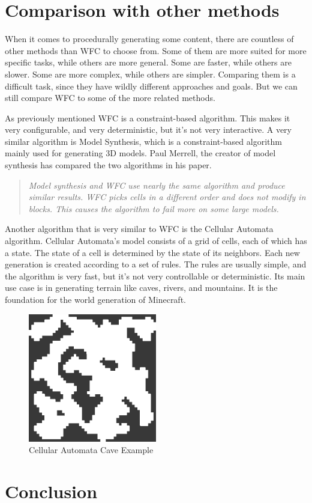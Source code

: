 \documentclass[10pt,oneside,a4paper]{article}
\begin{document}
\section{Comparison with other methods}\label{sec:comparison}
When it comes to procedurally generating some content, there are countless of other methods than WFC to choose from.
Some of them are more suited for more specific tasks, while others are more general.
Some are faster, while others are slower. Some are more complex, while others are simpler.
Comparing them is a difficult task, since they have wildly different approaches and goals.
But we can still compare WFC to some of the more related methods.

As previously mentioned WFC is a constraint-based algorithm. This makes it very configurable, and very deterministic, but it's not very interactive.
A very similar algorithm is Model Synthesis, which is a constraint-based algorithm mainly used for generating 3D models.
Paul Merrell, the creator of model synthesis has compared the two algorithms in his paper\cite{Mer21}.
\begin{quote}
    \textit{Model synthesis and WFC use nearly the same algorithm and produce similar results. WFC picks cells in a different
order and does not modify in blocks. This causes the algorithm to fail more on some large models.}
\end{quote}

Another algorithm that is very similar to WFC is the Cellular Automata algorithm.
Cellular Automata's model consists of a grid of cells, each of which has a state.
The state of a cell is determined by the state of its neighbors. Each new generation is created according to a set of rules.
The rules are usually simple, and the algorithm is very fast, but it's not very controllable or deterministic.
Its main use case is in generating terrain like caves, rivers, and mountains. It is the foundation for the world generation of Minecraft.

\begin{figure}[!h]
    \centering
    \includegraphics[width=0.5\textwidth]{figures/cellular-automata-cave.png}
    \caption{Cellular Automata Cave Example}\label{fig:cellular_automata}
\end{figure}


\section{Conclusion}\label{sec:conclusion}


\end{document}
